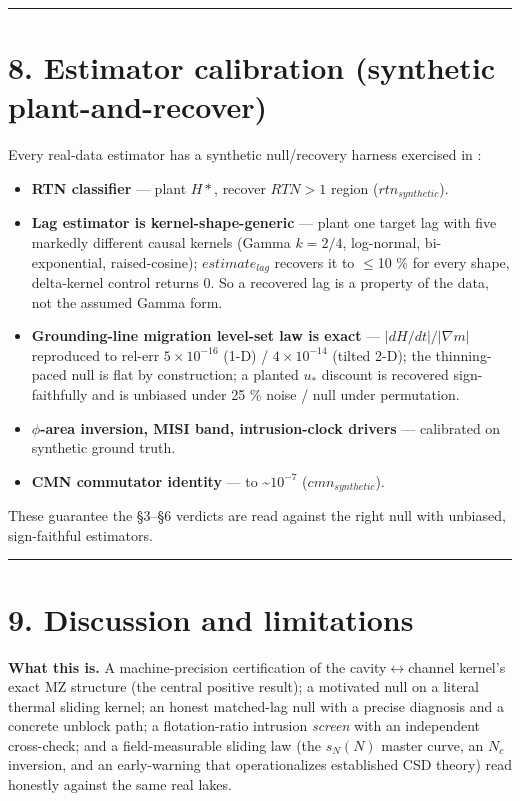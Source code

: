 \documentclass[11pt]{article}
\begin{document}
\medskip\hrule\medskip


\section*{8. Estimator calibration (synthetic plant-and-recover)}


Every real-data estimator has a synthetic null/recovery harness exercised in :


\begin{itemize}
\item \textbf{RTN classifier} — plant $H*$, recover $RTN>1$ region ($rtn_{synthetic}$).
\item \textbf{Lag estimator is kernel-shape-generic} — plant one target lag with five markedly different causal kernels (Gamma $k=2/4$, log-normal, bi-exponential, raised-cosine); $estimate_{lag}$ recovers it to \ensuremath{\le}10 \% for every shape, delta-kernel control returns 0. So a recovered lag is a property of the data, not the assumed Gamma form.
\item \textbf{Grounding-line migration level-set law is exact} — $|dH/dt|/|\nabla m|$ reproduced to rel-err $5\times 10^{-16}$ (1-D) / $4\times 10^{-14}$ (tilted 2-D); the thinning-paced null is flat by construction; a planted $u_*$ discount is recovered sign-faithfully and is unbiased under 25 \% noise / null under permutation.
\item \textbf{$\phi $-area inversion, MISI band, intrusion-clock drivers} — calibrated on synthetic ground truth.
\item \textbf{CMN commutator identity} — to \textasciitilde{}$10^{-7}$ ($cmn_{synthetic}$).
\end{itemize}


These guarantee the §3–§6 verdicts are read against the right null with unbiased, sign-faithful estimators.


\medskip\hrule\medskip


\section*{9. Discussion and limitations}


\textbf{What this is.} A machine-precision certification of the cavity\ensuremath{\leftrightarrow}channel kernel's exact MZ structure (the central positive result); a motivated null on a literal thermal sliding kernel; an honest matched-lag null with a precise diagnosis and a concrete unblock path; a flotation-ratio intrusion \emph{screen} with an independent cross-check; and a field-measurable sliding law (the $s_{N}(N)$ master curve, an $N_{c}$ inversion, and an early-warning that operationalizes established CSD theory) read honestly against the same real lakes.
\end{document}
